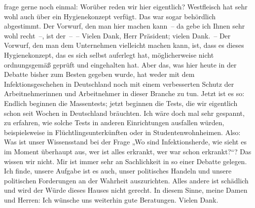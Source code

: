 \documentclass{article}
\begin{document}
frage gerne noch einmal: Worüber reden wir hier eigentlich? Westfleisch hat sehr wohl auch über ein Hygienekonzept verfügt. Das war sogar behördlich abgestimmt. Der Vorwurf, den man hier machen kann – da gebe ich Ihnen sehr wohl recht –, ist der – –   Vielen Dank, Herr Präsident; vielen Dank. – Der Vorwurf, den man dem Unternehmen vielleicht machen kann, ist, dass es dieses Hygienekonzept, das es sich selbst auferlegt hat, möglicherweise nicht ordnungsgemäß geprüft und eingehalten hat. Aber das, was hier heute in der Debatte bisher zum Besten gegeben wurde, hat weder mit dem Infektionsgeschehen in Deutschland noch mit einem verbesserten Schutz der Arbeitnehmerinnen und Arbeitnehmer in dieser Branche zu tun. Jetzt ist es so: Endlich beginnen die Massentests; jetzt beginnen die Tests, die wir eigentlich schon seit Wochen in Deutschland bräuchten. Ich wäre doch mal sehr gespannt, zu erfahren, wie solche Tests in anderen Einrichtungen ausfallen würden, beispielsweise in Flüchtlingsunterkünften oder in Studentenwohnheimen.  Also: Was ist unser Wissensstand bei der Frage „Wo sind Infektionsherde, wie sieht es im Moment überhaupt aus, wer ist alles erkrankt, wer war schon erkrankt?“? Das wissen wir nicht.  Mir ist immer sehr an Sachlichkeit in so einer Debatte gelegen.  Ich finde, unsere Aufgabe ist es auch, unser politisches Handeln und unsere politischen Forderungen an der Wahrheit auszurichten. Alles andere ist schädlich und wird der Würde dieses Hauses nicht gerecht. In diesem Sinne, meine Damen und Herren: Ich wünsche uns weiterhin gute Beratungen. Vielen Dank.  
\end{document}
